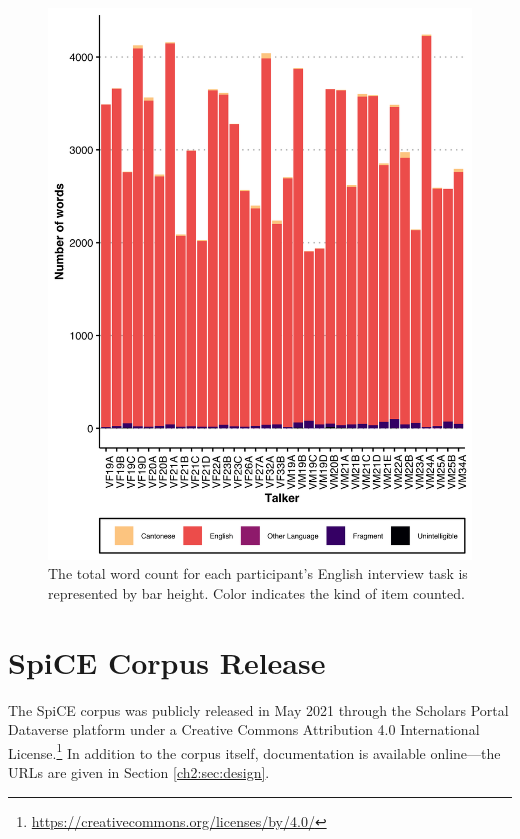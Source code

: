 \begin{figure}[!htbp]
  \begin{center}
  \includegraphics[width=4.9in]{figures/ch2_englishtypecounts_5in.png} 
  \caption{The total word count for each participant's English interview task is represented by bar height. Color indicates the kind of item counted. }
  \label{ch2:fig:englishtypecounts}
  \end{center}
\end{figure}

\section{SpiCE Corpus Release}\label{ch2:sec:releases}

The SpiCE corpus was publicly released in May 2021 through the Scholars Portal Dataverse platform under a Creative Commons Attribution 4.0 International License.\footnote{\url{https://creativecommons.org/licenses/by/4.0/}} In addition to the corpus itself, documentation is available online---the URLs are given in Section \ref{ch2:sec:design}.

